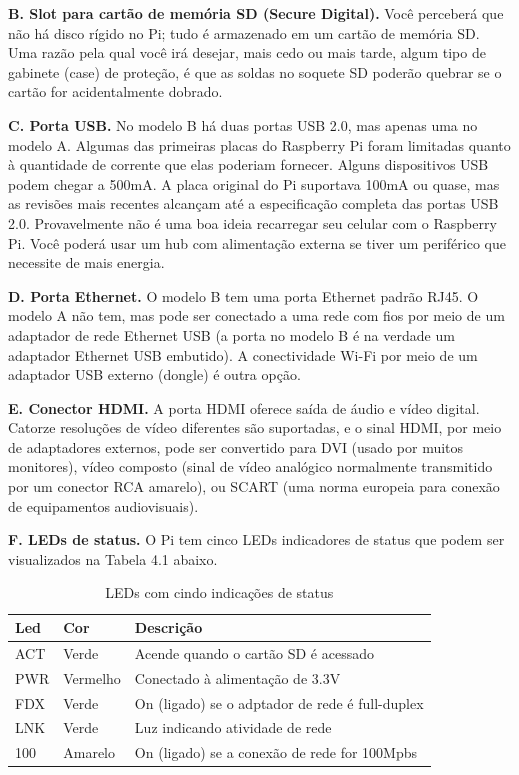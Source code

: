 \textbf{B. Slot para cartão de memória SD (Secure Digital).} Você perceberá que não há disco rígido no Pi; tudo é armazenado em um cartão de memória SD. Uma razão pela qual você irá desejar, mais cedo ou mais tarde, algum tipo de gabinete (case) de proteção, é que as soldas no soquete SD poderão quebrar se o cartão for acidentalmente dobrado.

\textbf{C. Porta USB.} No modelo B há duas portas USB 2.0, mas apenas uma no modelo A. Algumas das primeiras placas do Raspberry Pi foram limitadas quanto à quantidade de corrente que elas poderiam fornecer. Alguns dispositivos USB podem chegar a 500mA. A placa original do Pi suportava 100mA ou quase, mas as revisões mais recentes alcançam até a especificação completa das portas USB 2.0. Provavelmente não é uma boa ideia recarregar seu celular com o Raspberry Pi. Você poderá usar um hub com alimentação externa se tiver um periférico que necessite de mais energia.

\textbf{D. Porta Ethernet.} O modelo B tem uma porta Ethernet padrão RJ45. O modelo A não tem, mas pode ser conectado a uma rede com fios por meio de um adaptador de rede Ethernet USB (a porta no modelo B é na verdade um adaptador Ethernet USB embutido). A conectividade Wi-Fi por meio de um adaptador USB externo (dongle) é outra opção.

\textbf{E. Conector HDMI.} A porta HDMI oferece saída de áudio e vídeo digital. Catorze resoluções de vídeo diferentes são suportadas, e o sinal HDMI, por meio de adaptadores externos, pode ser convertido para DVI (usado por muitos monitores), vídeo composto (sinal de vídeo analógico normalmente transmitido por um conector RCA amarelo), ou SCART (uma norma europeia para conexão de equipamentos audiovisuais).

\textbf{F. LEDs de status.} O Pi tem cinco LEDs indicadores de status que podem ser visualizados na Tabela 4.1 abaixo.

\begin{table}[!htpb]
 \centering
    \begin{tabular}{|l|p{2cm}|l|} 
    \hline
        \textbf{Led} & \textbf{Cor} & \textbf{Descrição} \\
    \hline
        ACT & Verde & Acende quando o cartão SD é acessado \\
    \hline
        PWR & Vermelho & Conectado à alimentação de 3.3V \\
    \hline
        FDX & Verde & On (ligado) se o adptador de rede é full-duplex \\
    \hline
        LNK & Verde & Luz indicando atividade de rede \\
    \hline
        100 & Amarelo & On (ligado) se a conexão de rede for 100Mpbs \\
    \hline
    \end{tabular}
    \caption{LEDs com cindo indicações de status}
    \label{t_fixa}
\end{table}

